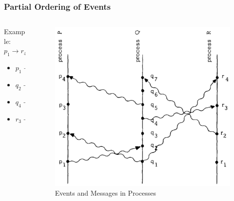 \documentclass{beamer}
\begin{document}
\frame
{
  \frametitle{Partial Ordering of Events}
	\begin{columns}
	\begin{column}{0.6\textwidth}

		Example: $p_1\to r_4$
		\begin{itemize}
			\item<2-> $p_1\to q_2$
			\item<3-> $q_2\to q_4$
			\item<4-> $q_4\to r_3$
			\item<5-> $r_3\to r_4$
		\end{itemize}


	\end{column}
	\begin{column}{0.4\textwidth}

		\begin{figure}[ht!]
		\includegraphics[width=\textwidth]{files/events-messages.png}
		\caption{Events and Messages in Processes}
		\end{figure}


	\end{column}
	\end{columns}

}
\end{document}
